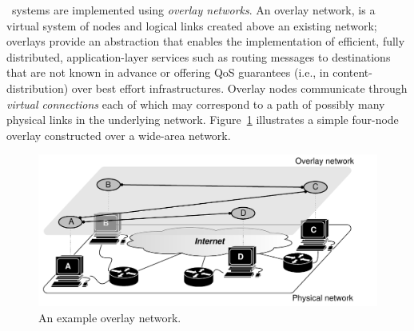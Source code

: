 \p\ systems are implemented using \emph{overlay networks}. 
An overlay network, is a virtual system of nodes and logical links
created above an existing network; overlays provide an abstraction that
enables the implementation of efficient, fully distributed, application-layer
services such as routing messages to destinations that are not known in advance
or offering QoS guarantees (i.e., in content-distribution) over best effort
infrastructures. Overlay nodes communicate through \emph{virtual connections}
each of which may correspond to a path of possibly many physical links 
in the underlying network.
Figure~\ref{figure:overlay} illustrates a simple four-node overlay constructed
over a wide-area network.
\begin{figure}[ht]
\centering
  \includegraphics[scale=0.53]{img/pdf/under-over-lay.pdf}
\caption{An example overlay network.}
\label{figure:overlay}
\end{figure}

